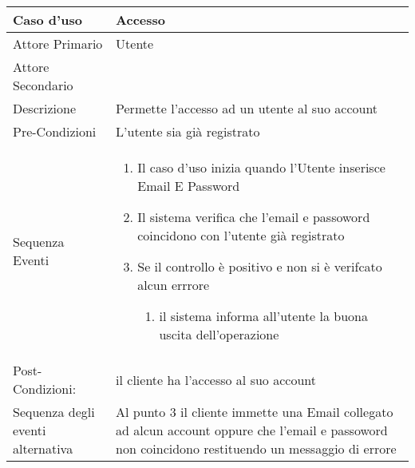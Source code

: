 \begin{tabular}{|p{3cm}|p{7cm}|}
\hline 
\rowcolor{Orchid}
Caso d'uso & Accesso \\
\hline
Attore Primario & Utente\\
\hline
Attore Secondario & \\
\hline
Descrizione & Permette l'accesso ad un utente al suo account\\
\hline
Pre-Condizioni& L'utente sia già registrato\\
\hline
  Sequenza Eventi&
                   \begin{enumerate}
                   \item Il caso d'uso inizia quando l'Utente inserisce Email E Password
                   \item Il sistema verifica che l'email e  passoword coincidono con l'utente già registrato
                   \item Se il controllo è positivo e non si è verifcato alcun errrore
                     \begin{enumerate}
                     \item il sistema informa all'utente la buona uscita dell'operazione
                     \end{enumerate}
                   \end{enumerate}\\
\hline
Post-Condizioni: &il cliente ha l'accesso al suo account \\
\hline
Sequenza degli eventi alternativa & Al punto 3 il cliente immette una Email collegato ad alcun account  oppure che l'email e passoword non coincidono restituendo un messaggio di errore\\
\hline
\end{tabular}

